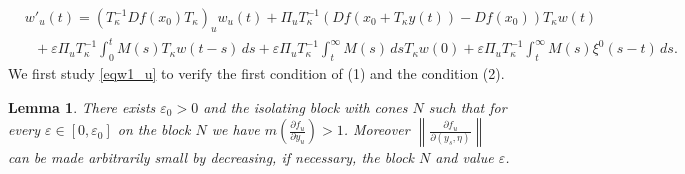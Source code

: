 \documentclass[11pt, leqno]{amsart}
\newtheorem{lem}[thm]{Lemma}
\theoremstyle{definition}
\begin{document}
\begin{align}
	& w'_u(t) = (T_\kappa^{-1}D f(x_0) T_\kappa)_u w_u(t) + \Pi_uT_\kappa^{-1} (Df(x_0 + T_\kappa y(t)) - D f(x_0)) T_\kappa w(t) \nonumber\\
	& \ \ \  + \varepsilon \Pi_uT_\kappa^{-1}\int_0^t M(s) T_\kappa w(t-s)\, ds  + \varepsilon \Pi_uT_\kappa^{-1}\int_t^\infty M(s) \, dsT_\kappa w(0) + \varepsilon \Pi_uT_\kappa^{-1}\int_t^\infty M(s) \xi^0(s-t)\, ds.\label{eqw1_u}
\end{align}
We first study \eqref{eqw1_u} to verify
the first condition of (1) and the condition (2).
\begin{lem}
	There exists $\varepsilon_0>0$ and the isolating block with cones  $N$ such that for every $\varepsilon\in [0,\varepsilon_0]$ on the block $N$  we have  $m\left(\frac{\partial f_u}{\partial y_u}\right) > 1$. Moreover
	$\left\|\frac{\partial f_u}{\partial (y_s,\eta)}\right\|$ can be made arbitrarily small by decreasing, if necessary, the block $N$ and value $\varepsilon$.
	\end{lem}
\end{document}
